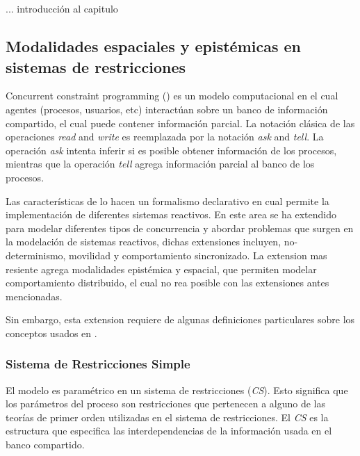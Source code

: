 \chapter{\SCCP}
\label{cap3.sccp}      

... introducci\'on al capitulo


\section{Modalidades espaciales y epist\'emicas en sistemas de restricciones}
\label{mod.cap3}

Concurrent constraint programming (\textbf{\CCP}) es un modelo computacional en el cual agentes (procesos, usuarios, etc) interact\'uan sobre un banco de informaci\'on compartido, el cual puede contener informaci\'on parcial. La notaci\'on cl\'asica de las operaciones \textit{read} and \textit{write} es reemplazada por la notaci\'on \textit{ask} and \textit{tell}. La operaci\'on \textit{ask} intenta inferir si es posible obtener informaci\'on de los procesos, mientras que la operaci\'on \textit{tell} agrega informaci\'on parcial al banco de los procesos.

Las caracter\'isticas de \textbf{\CCP} lo hacen un formalismo declarativo en cual permite la implementaci\'on de diferentes sistemas reactivos. En este area \textbf{\CCP} se ha extendido para modelar diferentes tipos de concurrencia y abordar problemas que surgen en la modelaci\'on de sistemas reactivos, dichas extensiones incluyen, no-determinismo, movilidad y comportamiento sincronizado. La extension mas resiente agrega modalidades epist\'emica y espacial, que permiten modelar comportamiento distribuido, el cual no rea posible con las extensiones antes mencionadas.

Sin embargo, esta extension requiere de algunas definiciones particulares sobre los conceptos usados en \textbf{\CCP}.

\subsection{Sistema de Restricciones Simple}
\label{srs.cap3}

El modelo \textbf{\CCP} es param\'etrico en un sistema de restricciones (\textit{CS}). Esto significa que los par\'ametros del proceso son restricciones que pertenecen a alguno de las teor\'ias de primer orden utilizadas en el sistema de restricciones. El \textit{CS} es la estructura que especifica las interdependencias de la informaci\'on usada en el banco compartido. 

